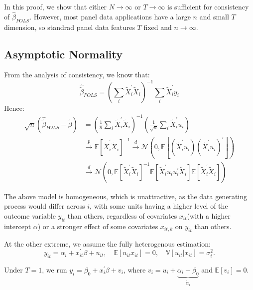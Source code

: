 In this proof, we show that either $N \to \infty $ or $T \to  \infty $ is sufficient for consistency of $\hat{\beta}_{POLS}$.
However, most panel data applications have a large $n$ and small $T$ dimension, so standrad panel data
features $T$ fixed and $n \to \infty $.

\subsection{Asymptotic Normality}

From the analysis of consistency, we know that:
\[ 
\hat{\tilde{\beta}}_{POLS}  = \left(\sum_i \tilde{X}_i^{\prime} \tilde{X}_i \right)^{-1} \sum_i \tilde{X}_i^{\prime} y_i
\]
Hence:
\begin{align*}
    \sqrt{n} (\hat{\tilde{\beta}}_{POLS}  - \tilde{\beta}) &= \left(\frac{1}{n} \sum_i \tilde{X}_i^{\prime} \tilde{X}_i \right)^{-1} \left(\frac{1}{\sqrt{n} } \sum_i \tilde{X}_i^{\prime} u_i \right) \\
    & \overset{p}{\rightarrow}\mathbb{E}[\tilde{X}_i^{\prime} \tilde{X}_i]^{-1} \overset{d}{\rightarrow} \mathcal{N}\left(0, \mathbb{E}\left[\left(\tilde{X}_i^{\prime} u_i\right) \left(\tilde{X}_i^{\prime} u_i\right)^{\prime} \right] \right)\\
    & \overset{d}{\rightarrow} \mathcal{N} \left(0, \mathbb{E}\left[\tilde{X}_i^{\prime} \tilde{X}_i \right]^{-1} \mathbb{E}\left[\tilde{X}_i^{\prime} u_i u_i^{\prime} \tilde{X}_i \right] \mathbb{E}\left[\tilde{X}_i^{\prime} \tilde{X}_i \right] \right)
\end{align*}


The above model is homogeneous, which is unattractive, as the data generating process would 
differ across $i$, with some units having a higher level of the outcome variable $y_{it} $
than others, regardless of covariates $x_{it}$(with a higher intercept $\alpha$) or a stronger effect
of some covariates $x_{it, k} $ on $y_{it}$ than others.

At the other extreme, we assume the fully heterogenous estimation:
\[y_{it} = \alpha_i + x_{it}^{\prime} \beta + u_{it}, \quad \mathbb{E}[u_{it} x_{it}] = 0, \quad \mathbb{V}[u_{it} | x_{it}] = \sigma_i^2. \]

Under $T=1$, we run $y_i = \beta_0 + x_i^{\prime} \beta + v_i$, 
where $v_i = u_i + \underset{\tilde{\alpha}_i}{\underbrace{\alpha_i - \beta_0}}$
and $\mathbb{E}[v_i] = 0$.


